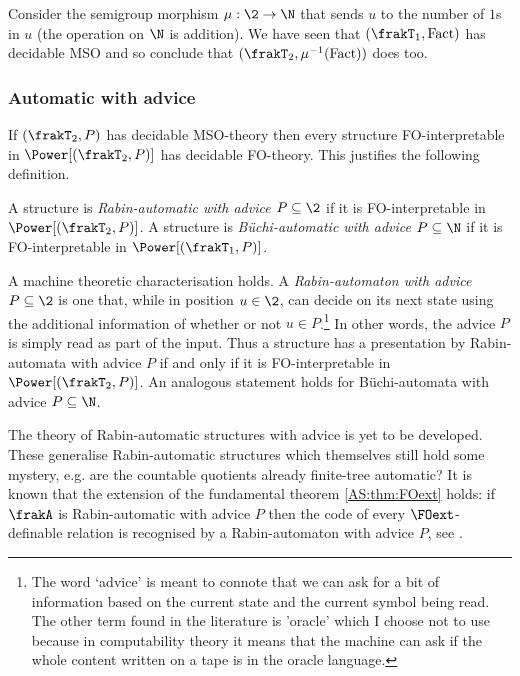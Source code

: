\begin{example}
Consider the semigroup morphism  $\mu:\2 \to \N$ that sends
$u$ to the number of $1$s in $u$ (the operation on $\N$ is addition). We have seen that $(\frakT_1,\textrm{Fact})$ has decidable MSO and so conclude that
$(\frakT_2,\mu^{-1}(\textrm{Fact}))$ does too.
\end{example}


\subsubsection*{Automatic with advice}

If $(\frakT_2,P)$ has decidable MSO-theory then every structure FO-interpretable in $\Power[(\frakT_2,P)]$ has decidable FO-theory. This justifies
the following definition.

\begin{definition} \cite{CoLo07}
A structure is  {\em Rabin-automatic with advice $P \subseteq \2$} if it is FO-interpretable in $\Power[(\frakT_2,P)]$.
A structure is  {\em B\"uchi-automatic with advice $P \subseteq \N$}  if it is FO-interpretable in $\Power[(\frakT_1,P)]$.
\end{definition}

A machine theoretic characterisation holds. A {\em Rabin-automaton with
advice $P \subseteq \2$} is one that, while in position $u \in \2$, can decide on its next
state using the additional information of whether or not $u \in P$.\footnote{The word `advice' is meant to connote that we can ask for a bit of information based on the current state and the current symbol being read. The other term found in the literature is 'oracle' which I choose not to use because in computability theory it means that the machine can ask if the whole content written on a tape is in the oracle language.}  In other words, the advice $P$ is simply read as part
of the input. Thus a structure has a presentation by Rabin-automata with advice $P$ if and only if it is FO-interpretable in $\Power[(\frakT_2,P)]$. An analogous statement holds for B\"uchi-automata with advice $P \subseteq \N$.


The theory of Rabin-automatic structures with advice is yet to be developed. These generalise Rabin-automatic structures which themselves still hold some mystery, e.g. are the countable quotients already finite-tree automatic? It is known that the extension of the fundamental theorem \ref{AS:thm:FOext} holds: if $\frakA$ is Rabin-automatic with advice $P$ then the code of every $\FOext$-definable relation is recognised by a Rabin-automaton with advice $P$, see \cite{BKRa}. 

